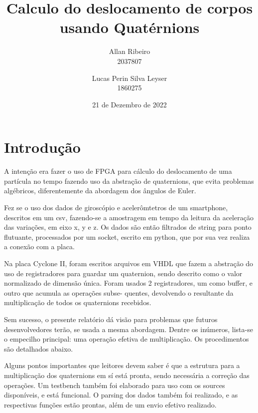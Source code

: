 \documentclass [12pt,oneside] {article}
\begin{document}
\title {Calculo do deslocamento de corpos usando Quatérnions}

\author {
	Allan Ribeiro \\
	2037807 \\
	\and
	Lucas Perin Silva Leyser \\
	1860275
}

\date {21 de Dezembro de 2022}
\maketitle

\section{Introdução}

	A intenção era fazer o uso de FPGA para cálculo do
deslocamento de uma partícula no tempo fazendo uso da abstração de
quaternions, que evita problemas algébricos, diferentemente da
abordagem dos ângulos de Euler.

	Fez se o uso dos dados de giroscópio e acelerômtetros de um
smartphone, descritos em um csv, fazendo-se a amostragem em tempo da
leitura da aceleração das variações, em eixo x, y e z. Os dados são
então filtrados de string para ponto flutuante, processados por um socket,
escrito em python, que por sua vez realiza a conexão com a placa.

	Na placa Cyclone II, foram escritos arquivos em VHDL que fazem
a abstração do uso de registradores para guardar um quaternion, sendo
descrito como o valor normalizado de dimensão única. Foram usados 2
registradores, um como buffer, e outro que acumula as operações subse-
quentes, devolvendo o resultante da multiplicação de todos os
quaternions recebidos.

	Sem sucesso, o presente relatório dá visão para problemas que
futuros desenvolvedores terão, se usada a mesma abordagem. Dentre os
inúmeros, lista-se o empecilho principal: uma operação efetiva de
multiplicação. Os procedimentos são detalhados abaixo.

	Alguns pontos importantes que leitores devem saber é que a
estrutura para a multiplicação dos quaternions em sí está pronta,
sendo necessária a correção das operações. Um testbench também foi
elaborado para uso com os sources disponíveis, e está funcional. O
parsing dos dados também foi realizado, e as respectivas funções estão
prontas, além de um envio efetivo realizado.
\end{document}
